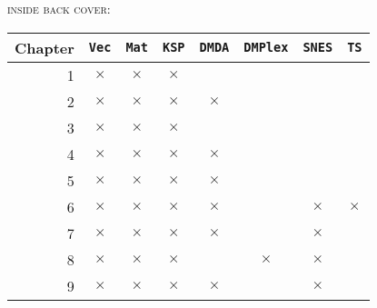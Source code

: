 \documentclass{tufte-book}
\theoremstyle{definition}
\newcommand{\XX}{$\bm{\times}$}  %
\newcommand{\gX}{{\color{Gray} $\times$}}
\newcommand{\pDMDA}{\texttt{DMDA}\xspace}
\newcommand{\pDMPlex}{\texttt{DMPlex}\xspace}
\newcommand{\pKSP}{\texttt{KSP}\xspace}
\newcommand{\pSNES}{\texttt{SNES}\xspace}
\newcommand{\pTS}{\texttt{TS}\xspace}
\newcommand{\pMat}{\texttt{Mat}\xspace}
\newcommand{\pVec}{\texttt{Vec}\xspace}
\begin{document}
\newpage\thispagestyle{empty}
\noindent \textsc{inside back cover:}

\vfill
\begin{center}
\begin{tabular}{rccccccc}
\toprule
Chapter 
    &\;\pVec\; &\;\pMat\;
                &\;\pKSP\; &\pDMDA
                            &\pDMPlex
                                  &\pSNES &\;\pTS\; \\
\midrule
1   & \XX & \XX & \XX &     &     &     &      \\
2   & \XX & \XX & \XX & \XX &     &     &      \\
3   & \XX & \XX & \XX &     &     &     &      \\
4   & \gX & \gX & \XX & \XX &     &     &      \\
5   & \gX & \gX & \XX & \XX &     &     &      \\
6   & \gX & \gX & \XX & \XX &     & \XX & \XX  \\
7   & \gX & \gX & \gX & \XX &     & \XX &      \\
8   & \gX & \gX & \XX &     & \XX & \XX &      \\
9   & \gX & \gX & \gX & \XX &     & \XX &      \\
\bottomrule
\end{tabular}
\end{center}
\vfill
\end{document}
